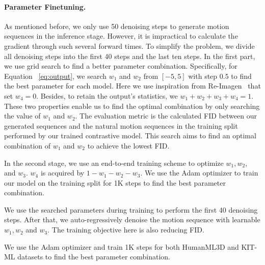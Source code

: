 \documentclass[10pt,twocolumn,letterpaper]{article}
\begin{document}
\noindent\paragraph{Parameter Finetuning.} As mentioned before, we only use 50 denoising steps to generate motion sequences in the inference stage. However, it is impractical to calculate the gradient through such several forward times. To simplify the problem, we divide all denoising steps into the first 40 steps and the last ten steps. In the first part, we use grid search to find a better parameter combination. Specifically, for Equation ~\ref{eq:output}, we search $w_1$ and $w_2$ from $[-5, 5]$ with step $0.5$ to find the best parameter for each model. Here we use inspiration from Re-Imagen~\cite{chen2022re} that set $w_4=0$. Besides, to retain the output's statistics, we $w_1 + w_2 + w_3 + w_4=1$. These two properties enable us to find the optimal combination by only searching the value of $w_1$ and $w_2$. The evaluation metric is the calculated FID between our generated sequences and the natural motion sequences in the training split performed by our trained contrastive model. This search aims to find an optimal combination of $w_1$ and $w_2$ to achieve the lowest FID.

In the second stage, we use an end-to-end training scheme to optimize $w_1, w_2$, and $w_3$. $w_4$ is acquired by $1-w_1-w_2-w_3$. We use the Adam optimizer to train our model on the training split for 1K steps to find the best parameter combination.

We use the searched parameters during training to perform the first 40 denoising steps. After that, we auto-regressively denoise the motion sequence with learnable $w_1, w_2$ and $w_3$. The training objective here is also reducing FID.

We use the Adam optimizer and train 1K steps for both HumanML3D and KIT-ML datasets to find the best parameter combination.
\end{document}

